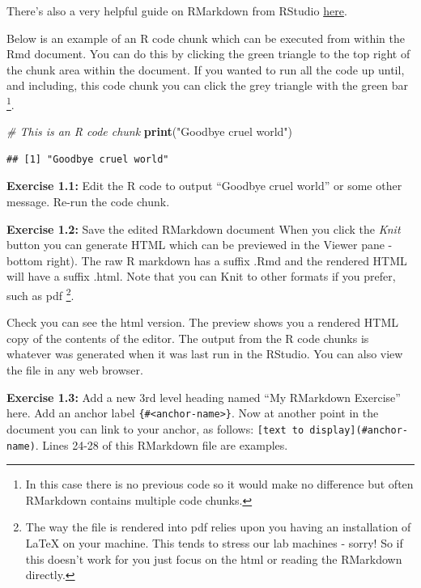 \documentclass[
]{article}
\newenvironment{Shaded}{\begin{snugshade}}{\end{snugshade}}
\newcommand{\CommentTok}[1]{\textcolor[rgb]{0.56,0.35,0.01}{\textit{#1}}}
\newcommand{\FunctionTok}[1]{\textcolor[rgb]{0.13,0.29,0.53}{\textbf{#1}}}
\newcommand{\NormalTok}[1]{#1}
\newcommand{\StringTok}[1]{\textcolor[rgb]{0.31,0.60,0.02}{#1}}
\begin{document}
There's also a very helpful guide on RMarkdown from RStudio
\href{https://rmarkdown.rstudio.com/lesson-2.html}{here}.

Below is an example of an R code chunk which can be executed from within
the Rmd document. You can do this by clicking the green triangle to the
top right of the chunk area within the document. If you wanted to run
all the code up until, and including, this code chunk you can click the
grey triangle with the green bar \footnote{In this case there is no
  previous code so it would make no difference but often RMarkdown
  contains multiple code chunks.}.

\begin{Shaded}
\begin{Highlighting}[]
\CommentTok{\# This is an R code chunk}
\FunctionTok{print}\NormalTok{(}\StringTok{"Goodbye cruel world"}\NormalTok{)}
\end{Highlighting}
\end{Shaded}

\begin{verbatim}
## [1] "Goodbye cruel world"
\end{verbatim}

\textbf{Exercise 1.1:} Edit the R code to output ``Goodbye cruel world''
or some other message. Re-run the code chunk.

\textbf{Exercise 1.2:} Save the edited RMarkdown document When you click
the \emph{Knit} button you can generate HTML which can be previewed in
the Viewer pane - bottom right). The raw R markdown has a suffix .Rmd
and the rendered HTML will have a suffix .html. Note that you can Knit
to other formats if you prefer, such as pdf \footnote{The way the file
  is rendered into pdf relies upon you having an installation of LaTeX
  on your machine. This tends to stress our lab machines - sorry! So if
  this doesn't work for you just focus on the html or reading the
  RMarkdown directly.}.

Check you can see the html version. The preview shows you a rendered
HTML copy of the contents of the editor. The output from the R code
chunks is whatever was generated when it was last run in the RStudio.
You can also view the file in any web browser.

\textbf{Exercise 1.3:} Add a new 3rd level heading named ``My RMarkdown
Exercise'' here. Add an anchor label
\texttt{\{\#\textless{}anchor-name\textgreater{}\}}. Now at another
point in the document you can link to your anchor, as follows:
\texttt{{[}text\ to\ display{]}(\#anchor-name)}. Lines 24-28 of this
RMarkdown file are examples.
\end{document}
